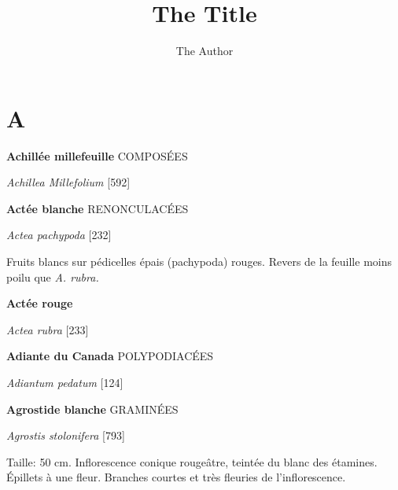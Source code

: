 \documentclass[book,12pt,a4paper,onecolumn,openany]{memoir}
\title{The Title}
\author{The Author}
\date{}
\begin{document}
\begin{titlingpage}
\maketitle\vfill
\end{titlingpage}



\chapter*{A}

\textbf{Achillée millefeuille} \hfill {\small\scshape COMPOSÉES}
\par\noindent\emph{Achillea Millefolium} \hfill [592]

\vskip1cm

\noindent\textbf{Actée blanche} \hfill {\small\scshape RENONCULACÉES} 
\par\noindent\emph{Actea pachypoda} \hfill [232]			

Fruits blancs sur pédicelles épais (pachypoda) rouges.
Revers de la feuille moins poilu que \emph{A. rubra.}

\vskip1cm

\noindent\textbf{Actée rouge}  
\par\noindent\emph{Actea rubra} \hfill [233]

\vskip1cm

\noindent\textbf{Adiante du Canada} \hfill {\small\scshape POLYPODIACÉES}
\par\noindent\emph{Adiantum pedatum} \hfill [124]

\vskip1cm
				
\noindent\textbf{Agrostide blanche} \hfill {\small\scshape GRAMINÉES}  
\par\noindent\emph{Agrostis stolonifera} \hfill [793]

Taille: 50 cm. Inflorescence conique rougeâtre,
teintée du blanc des étamines. Épillets à une fleur.
Branches courtes et très fleuries de l’inflorescence.
\end{document}
